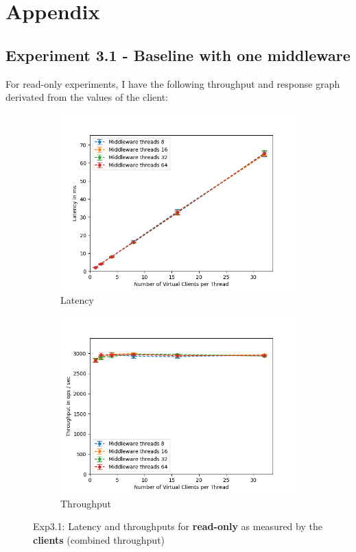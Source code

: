 \documentclass[11pt,a4paper]{article}
\begin{document}
\section{Appendix}

\subsection{Experiment 3.1 - Baseline with one middleware}
For read-only experiments, I have the following throughput and response graph derivated from the values of the client:

\begin{figure}[H]
\centering
\begin{subfigure}{.5\textwidth}
    \centering
    \includegraphics[width=\textwidth]{img/exp3_1/exp3_1__latency_client_write_0.png}
    \caption{Latency}
    \label{fig:mesh1}
\end{subfigure}%
\begin{subfigure}{.5\textwidth}
      \centering
    \includegraphics[width=\textwidth]{img/exp3_1/exp3_1__throughput_client_write_0.png}
    \caption{Throughput}
    \label{fig:mesh1}
\end{subfigure}
\caption{Exp3.1: Latency and throughputs for \textbf{read-only} as measured by the \textbf{clients} (combined throughput)}
\label{fig:test}
\end{figure}
\end{document}
